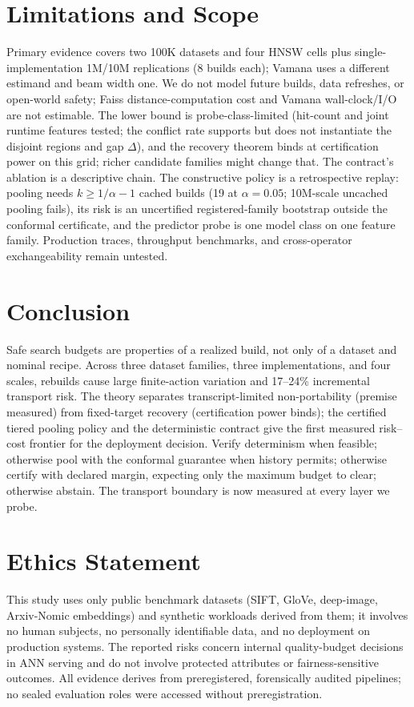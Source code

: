 \documentclass{article}
\begin{document}
\section{Limitations and Scope}
\label{sec:limitations}

Primary evidence covers two 100K datasets and four HNSW cells plus single-implementation 1M/10M
replications (8 builds each); Vamana uses a different estimand and beam width one. We do not model future
builds, data refreshes, or open-world safety; Faiss distance-computation cost and Vamana wall-clock/I/O
are not estimable. The lower bound is probe-class-limited (hit-count and joint runtime features tested;
the conflict rate supports but does not instantiate the disjoint regions and gap $\Delta$), and the
recovery theorem binds at certification power on this grid; richer candidate families might change that.
The contract's ablation is a descriptive chain. The constructive policy is a retrospective replay:
pooling needs $k\ge 1/\alpha-1$ cached builds (19 at $\alpha{=}0.05$; 10M-scale uncached pooling
fails), its risk is an uncertified registered-family bootstrap outside the conformal certificate, and the
predictor probe is one model class on one feature family. Production traces, throughput benchmarks, and cross-operator exchangeability remain untested.

\section{Conclusion}
\label{sec:conclusion}

Safe search budgets are properties of a realized build, not only of a dataset and nominal recipe.
Across three dataset families, three implementations, and four scales, rebuilds cause large
finite-action variation and 17--24\% incremental transport risk. The theory separates
transcript-limited non-portability (premise measured) from fixed-target recovery (certification power
binds); the certified tiered pooling policy and the deterministic contract give the first measured
risk--cost frontier for the deployment decision. Verify determinism when feasible; otherwise pool with the conformal guarantee when history permits;
otherwise certify with declared margin, expecting only the maximum budget to clear; otherwise abstain.
The transport boundary is now measured at every layer we probe.

\section*{Ethics Statement}
This study uses only public benchmark datasets (SIFT, GloVe, deep-image, Arxiv-Nomic embeddings) and
synthetic workloads derived from them; it involves no human subjects, no personally identifiable data,
and no deployment on production systems. The reported risks concern internal quality-budget decisions in
ANN serving and do not involve protected attributes or fairness-sensitive outcomes. All evidence derives
from preregistered, forensically audited pipelines; no sealed evaluation roles were accessed without
preregistration.
\end{document}
